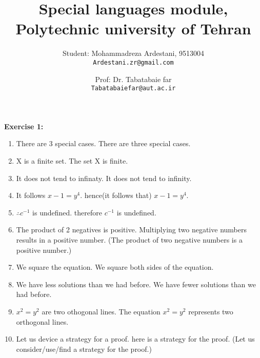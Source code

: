 \documentclass[11pt]{article}
\begin{document}
\author{
  Student: Mohammadreza Ardestani, 9513004\\
  \texttt{Ardestani.zr@gmail.com}
  \and
  Prof: Dr. Tabatabaie far\\
  \texttt{Tabatabaiefar@aut.ac.ir}
}
\title{Special languages module, Polytechnic university of Tehran}
\maketitle

\medskip
	{\textbf{\huge Exercise 1:}}
\begin{enumerate}
\item
There are 3 special cases. \textrightarrow \hspace*{0.25cm}  There are three special cases.
\item
X is a finite set. \textrightarrow \hspace*{0.25cm} The set X is finite.
\item
It does not tend to infinaty. \textrightarrow \hspace*{0.25cm} It does not tend to infinity.
\item
It follows $x-1=y^{4}$. \textrightarrow \hspace*{0.25cm} hence(it follows that) $x-1=y^{4}$.
\item
$\therefore c^{-1}$ is undefined. \textrightarrow \hspace*{0.25cm} therefore $c^{-1}$ is undefined.
\item
The product of 2 negatives is positive. \textrightarrow \hspace*{0.25cm} Multiplying two negative numbers results in a positive number. (The product of two negative numbers is a positive number.)
\item
We square the equation. \textrightarrow \hspace*{0.25cm} We square both sides of the equation.
\item
We have less solutions than we had before. \textrightarrow \hspace*{0.25cm}	We have fewer solutions than we had before.
\item
$x^{2} = y^{2}$ are two othogonal lines. \textrightarrow \hspace*{0.25cm} The equation $x^{2}=y^{2}$ represents two orthogonal lines.
\item
Let us device a strategy for a proof. \textrightarrow \hspace*{0.25cm} here is a strategy for the proof. (Let us consider/use/find a strategy for the proof.)

\end{enumerate}
\end{document}
